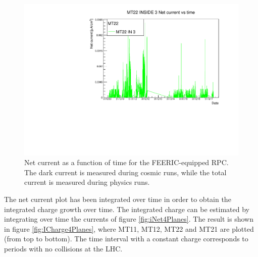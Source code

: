 \begin{figure}[!t]
\begin{center}
\includegraphics[width=0.95\linewidth]{Chapters/Performance/Figs/iNetFEERIC.pdf}
\caption{Net current as a function of time for the FEERIC-equipped RPC. The dark current is measured during cosmic runs, while the total current is measured during physics runs.}
\label{fig:FEERICiNet}
\end{center}
\end{figure}

The net current plot has been integrated over time in order to obtain the integrated charge growth over time.
The integrated charge can be estimated by integrating over time the currents of figure \ref{fig:iNet4Planes}. 
The result is shown in figure \ref{fig:ICharge4Planes}, where MT11, MT12, MT22 and MT21 are plotted (from top to bottom). 
The time interval with a constant charge corresponds to periods with no collisions at the LHC.

